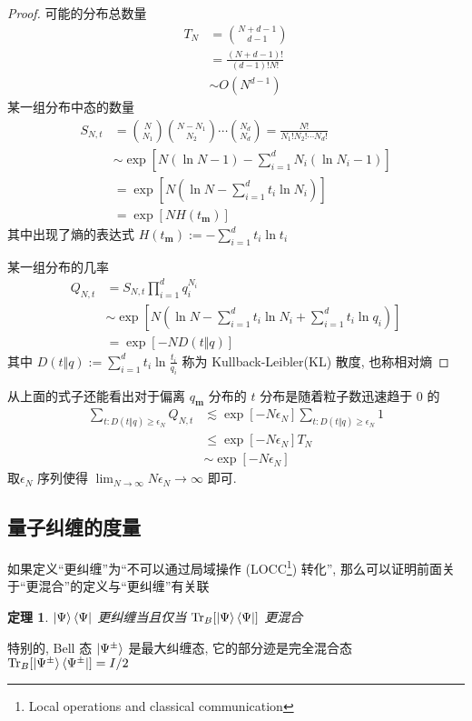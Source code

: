 \documentclass[12pt,a4paper]{article}
\renewcommand*{\vec}[1]{\bm{#1}}
\newcommand{\Tr}{\operatorname{Tr}}
\newtheorem{proof}{证明}
\newtheorem{theorem}{定理}
\begin{document}
    \begin{proof}
        可能的分布总数量
        \begin{align*}
            T_N &= \binom{N+d-1}{d-1} \\
            &=\frac{(N+d-1)!}{(d-1)!N!}\\
            &\sim O(N^{d-1})
        \end{align*}
        某一组分布中态的数量
        \begin{align*}
            S_{N,t} &= \binom{N}{N_1}\binom{N-N_1}{N_2}\cdots\binom{N_d}{N_d} 
            = \frac{N!}{N_1!N_2!\cdots N_d!} \\
            &\sim \exp\left[N(\ln N - 1) - \sum_{i=1}^d N_i(\ln N_i - 1)\right]\\
            &= \exp\left[N\left(\ln N - \sum_{i=1}^d t_i\ln N_i\right)\right]\\
            &= \exp\left[N H(t_{\vec m})\right]
        \end{align*}
        其中出现了熵的表达式 $H(t_{\vec m}) := -\sum_{i=1}^d t_i\ln t_i$

        某一组分布的几率
        \begin{align*}
            Q_{N,t} &= S_{N,t}\prod_{i=1}^dq_i^{N_i} \\
            &\sim\exp\left[N\left(
                \ln N - \sum_{i=1}^d t_i\ln N_i + \sum_{i=1}^d t_i\ln q_i
            \right)\right] \\
            &= \exp[-ND(t\Vert q)]
        \end{align*}
        其中 $D(t\Vert q) := \sum_{i=1}^d t_i\ln\frac{t_i}{q_i}$ 
        称为 Kullback-Leibler(KL) 散度, 也称相对熵\cite{kullback1951information}
    \end{proof}

    从上面的式子还能看出对于偏离 $q_{\vec m}$ 分布的 $t$ 分布是随着粒子数迅速趋于 $0$ 的
    \begin{align*}
        \sum_{t:D(t\Vert q)\ge\epsilon_N} Q_{N,t} 
        &\lesssim \exp[-N\epsilon_N]\sum_{t:D(t\Vert q)\ge\epsilon_N}1\\
        &\le \exp[-N\epsilon_N] T_N \\
        &\sim \exp[-N\epsilon_N]
    \end{align*}
    取$\epsilon_N$ 序列使得 $\lim_{N\to\infty}N\epsilon_N\to\infty$ 即可.

\subsection{量子纠缠的度量} %
\label{sub:measure_entanglement}
    如果定义``更纠缠''为``不可以通过局域操作 
    (LOCC\footnote{Local operations and classical communication}) 
    转化'', 那么可以证明前面关于``更混合''的定义与``更纠缠''有关联
    \begin{theorem}
        $\ket\Psi\bra\Psi$ 更纠缠当且仅当 $\Tr_B[\ket\Psi\bra\Psi]$ 更混合
    \end{theorem}
    特别的, Bell 态 $\ket{\Psi^\pm}$ 是最大纠缠态, 
    它的部分迹是完全混合态 $\Tr_B[\ket{\Psi^\pm}\bra{\Psi^\pm}] = I/2$
\end{document}
